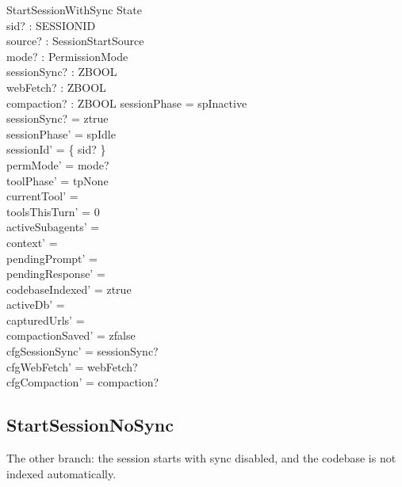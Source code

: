 \documentclass[a4paper,10pt,fleqn]{article}
\begin{document}
\begin{schema}{StartSessionWithSync}
  \Delta State \\
  sid? : SESSIONID \\
  source? : SessionStartSource \\
  mode? : PermissionMode \\
  sessionSync? : ZBOOL \\
  webFetch? : ZBOOL \\
  compaction? : ZBOOL
  \where
  sessionPhase = spInactive \\
  sessionSync? = ztrue \\
  sessionPhase' = spIdle \\
  sessionId' = \{ sid? \} \\
  permMode' = mode? \\
  toolPhase' = tpNone \\
  currentTool' = \emptyset \\
  toolsThisTurn' = 0 \\
  activeSubagents' = \emptyset \\
  context' = \langle \rangle \\
  pendingPrompt' = \emptyset \\
  pendingResponse' = \emptyset \\
  codebaseIndexed' = ztrue \\
  activeDb' = \emptyset \\
  capturedUrls' = \emptyset \\
  compactionSaved' = zfalse \\
  cfgSessionSync' = sessionSync? \\
  cfgWebFetch' = webFetch? \\
  cfgCompaction' = compaction?
\end{schema}

\subsection{StartSessionNoSync}

The other branch: the session starts with sync disabled, and the codebase
is not indexed automatically.
\end{document}
